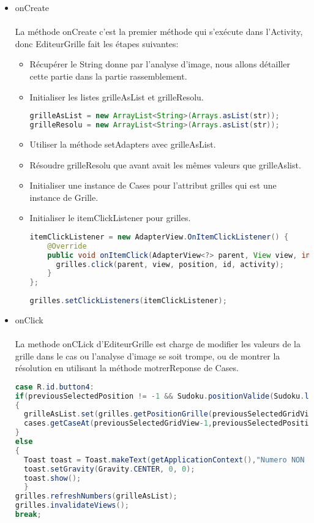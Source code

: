 \documentclass{article}
\begin{document}
\begin{itemize}
    \item{onCreate}
    \\
    \\
    La méthode onCreate c'est la premier méthode qui s'exécute dans l'Activity, donc EditeurGrille fait les étapes suivantes:
    
    \begin{itemize}
        \item Récupérer le String donne par l'analyse d'image, nous allons détailler cette partie dans la partie rassemblement.
        \item Initialiser les listes grilleAsList et grilleResolu.
        \begin{lstlisting}[language=Java, caption = Initialisation listes] 
grilleAsList = new ArrayList<String>(Arrays.asList(str));
grilleResolu = new ArrayList<String>(Arrays.asList(str));
        \end{lstlisting}
        \item Utiliser la méthode setAdapters avec grilleAsList.
        \item Résoudre grilleResolu que avant avait les mêmes valeurs que grilleAslist.
        \item Initialiser une instance de Cases pour l'attribut grilles qui est une instance de Grille.
        \item Initialiser le itemClickListener pour grilles.
        \begin{lstlisting}[language=Java, caption = Initialisation itemClickListener] 
itemClickListener = new AdapterView.OnItemClickListener() {
    @Override
    public void onItemClick(AdapterView<?> parent, View view, int position, long id) {
      grilles.click(parent, view, position, id, activity);
    }
};
        
grilles.setClickListeners(itemClickListener);
\end{lstlisting}
    
    \end{itemize}
    \item{onClick}
    \\
    \\
    La methode onCLick d'EditeurGrille est charge de modifier les valeurs de la grille dans le cas ou l'analyse d'image se soit trompe, ou de montrer la résolution en utilisant la méthode motrerReponse de Cases.
   \begin{lstlisting}[language=Java, caption = Exemple onClick EditeurGrille] 
case R.id.button4:
if(previousSelectedPosition != -1 && Sudoku.positionValide(Sudoku.listToArr(grilleAsList), 4, grilles.getPoints(posGrille).x, grilles.getPoints(posGrille).y))
{
  grilleAsList.set(grilles.getPositionGrille(previousSelectedGridView - 1, previousSelectedPosition), "4");
  cases.getCaseAt(previousSelectedGridView-1,previousSelectedPosition).setValeur("4");
}
else
{
  Toast toast = Toast.makeText(getApplicationContext(),"Numero NON valide", Toast.LENGTH_LONG);
  toast.setGravity(Gravity.CENTER, 0, 0);
  toast.show();
  }
grilles.refreshNumbers(grilleAsList);
grilles.invalidateViews();
break;
    \end{lstlisting}

\end{itemize}
\end{document}
